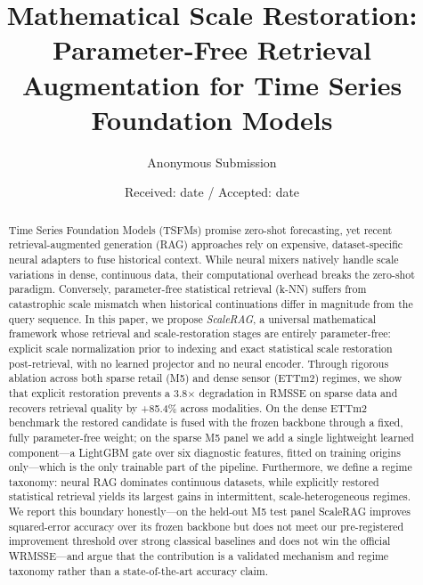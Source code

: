\documentclass[twocolumn]{svjour3}          %
\begin{document}
\title{Mathematical Scale Restoration: Parameter-Free Retrieval Augmentation for Time Series Foundation Models}

\author{Anonymous Submission}

\institute{}

\date{Received: date / Accepted: date}

\maketitle

\begin{abstract}
Time Series Foundation Models (TSFMs) promise zero-shot forecasting, yet recent retrieval-augmented generation (RAG) approaches rely on expensive, dataset-specific neural adapters to fuse historical context. While neural mixers natively handle scale variations in dense, continuous data, their computational overhead breaks the zero-shot paradigm. Conversely, parameter-free statistical retrieval (k-NN) suffers from catastrophic scale mismatch when historical continuations differ in magnitude from the query sequence.
In this paper, we propose \textit{ScaleRAG}, a universal mathematical framework whose retrieval and scale-restoration stages are entirely parameter-free: explicit scale normalization prior to indexing and exact statistical scale restoration post-retrieval, with no learned projector and no neural encoder. Through rigorous ablation across both sparse retail (M5) and dense sensor (ETTm2) regimes, we show that explicit restoration prevents a 3.8$\times$ degradation in RMSSE on sparse data and recovers retrieval quality by +85.4\% across modalities. On the dense ETTm2 benchmark the restored candidate is fused with the frozen backbone through a fixed, fully parameter-free weight; on the sparse M5 panel we add a single lightweight learned component---a LightGBM gate over six diagnostic features, fitted on training origins only---which is the only trainable part of the pipeline. Furthermore, we define a regime taxonomy: neural RAG dominates continuous datasets, while explicitly restored statistical retrieval yields its largest gains in intermittent, scale-heterogeneous regimes. We report this boundary honestly---on the held-out M5 test panel ScaleRAG improves squared-error accuracy over its frozen backbone but does not meet our pre-registered improvement threshold over strong classical baselines and does not win the official WRMSSE---and argue that the contribution is a validated mechanism and regime taxonomy rather than a state-of-the-art accuracy claim.
\end{abstract}









\end{document}
